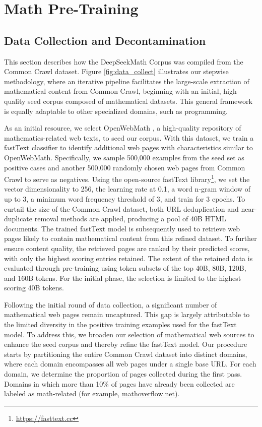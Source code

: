 \section{Math Pre-Training}

\subsection{Data Collection and Decontamination} This section describes how the DeepSeekMath Corpus was compiled from the Common Crawl dataset. Figure \ref{fig:data_collect} illustrates our stepwise methodology, where an iterative pipeline facilitates the large-scale extraction of mathematical content from Common Crawl, beginning with an initial, high-quality seed corpus composed of mathematical datasets. This general framework is equally adaptable to other specialized domains, such as programming.

As an initial resource, we select OpenWebMath \citep{openwebmath}, a high-quality repository of mathematics-related web texts, to seed our corpus. With this dataset, we train a fastText classifier \citep{joulin2016fasttext} to identify additional web pages with characteristics similar to OpenWebMath. Specifically, we sample 500,000 examples from the seed set as positive cases and another 500,000 randomly chosen web pages from Common Crawl to serve as negatives. Using the open-source fastText library\footnote{\url{https://fasttext.cc}}, we set the vector dimensionality to 256, the learning rate at 0.1, a word n-gram window of up to 3, a minimum word frequency threshold of 3, and train for 3 epochs. To curtail the size of the Common Crawl dataset, both URL deduplication and near-duplicate removal methods are applied, producing a pool of 40B HTML documents. The trained fastText model is subsequently used to retrieve web pages likely to contain mathematical content from this refined dataset. To further ensure content quality, the retrieved pages are ranked by their predicted scores, with only the highest scoring entries retained. The extent of the retained data is evaluated through pre-training using token subsets of the top 40B, 80B, 120B, and 160B tokens. For the initial phase, the selection is limited to the highest scoring 40B tokens.

Following the initial round of data collection, a significant number of mathematical web pages remain uncaptured. This gap is largely attributable to the limited diversity in the positive training examples used for the fastText model. To address this, we broaden our selection of mathematical web sources to enhance the seed corpus and thereby refine the fastText model. Our procedure starts by partitioning the entire Common Crawl dataset into distinct domains, where each domain encompasses all web pages under a single base URL. For each domain, we determine the proportion of pages collected during the first pass. Domains in which more than 10\% of pages have already been collected are labeled as math-related (for example, \url{mathoverflow.net}). 

